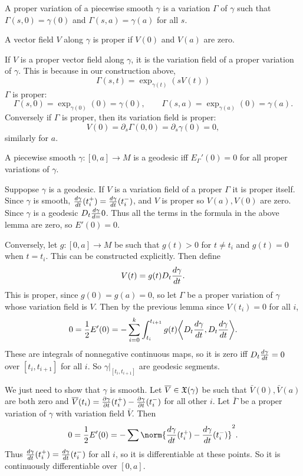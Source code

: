 \eproof

\bdefn

    A {\emphcolor proper variation} of a piecewise smooth $\gamma$ is a variation $\Gamma$ of $\gamma$ such that
    $\Gamma(s,0)=\gamma(0)$ and $\Gamma(s,a)=\gamma(a)$ for all $s$.

    A vector field $V$ along $\gamma$ is {\emphcolor proper} if $V(0)$ and $V(a)$ are zero.

\edefn

If $V$ is a proper vector field along $\gamma$, it is the variation field of a proper variation of $\gamma$.
This is because in our construction above,
$$ \Gamma(s,t) = \exp_{\gamma(t)}(sV(t)) $$
$\Gamma$ is proper:
$$ \Gamma(s,0) = \exp_{\gamma(0)}(0) = \gamma(0),\qquad \Gamma(s,a) = \exp_{\gamma(a)}(0) = \gamma(a) . $$
Conversely if $\Gamma$ is proper, then its variation field is proper:
$$ V(0) = \partial_s\Gamma(0,0) = \partial_s\gamma(0) = 0, $$
similarly for $a$.

\blemm

    A piecewise smooth $\gamma\colon[0,a]\to M$ is a geodesic iff $E_\Gamma'(0)=0$ for all proper variations of $\gamma$.

\elemm

\bproof

    Suppopse $\gamma$ is a geodesic.
    If $V$ is a variation field of a proper $\Gamma$ it is proper itself.
    Since $\gamma$ is smooth, ${{d\gamma}\over{dt}}(t_i^+)={{d\gamma}\over{dt}}(t_i^-)$, and $V$ is proper so $V(a),V(0)$ are zero.
    Since $\gamma$ is a geodesic $D_t{{d\gamma}\over{d=}}0$.
    Thus all the terms in the formula in the above lemma are zero, so $E'(0)=0$.

    Conversely, let $g\colon[0,a]\to M$ be such that $g(t)>0$ for $t\neq t_i$ and $g(t)=0$ when $t=t_i$.
    This can be constructed explicitly.
    Then define
    $$ V(t) = g(t)D_t{{d\gamma}\over{dt}}. $$
    This is proper, since $g(0)=g(a)=0$, so let $\Gamma$ be a proper variation of $\gamma$ whose variation field is $V$.
    Then by the previous lemma since $V(t_i)=0$ for all $i$,
    $$ 0 = {{1}\over{2}}E'(0) = -\sum_{i=0}^k\int_{t_i}^{t_{i+1}}g(t)\mathopen{}\mathclose{\left<D_t{{d\gamma}\over{dt}},D_t{{d\gamma}\over{dt}}\right>} . $$
    These are integrals of nonnegative continuous maps, so it is zero iff $D_t{{d\gamma}\over{dt}}=0$ over $[t_i,t_{i+1}]$
    for all $i$.
    So $\gamma|_{[t_i,t_{i+1}]}$ are geodesic segments.

    We just need to show that $\gamma$ is smooth.
    Let $\overline V\in{\frak X}(\gamma)$ be such that $\bar V(0),\bar V(a)$ are both zero and
    $\overline V(t_i)={{\partial \gamma}\over{\partial t}}(t_i^+)-{{\partial \gamma}\over{\partial t}}(t_i^-)$ for all other $i$.
    Let $\bar\Gamma$ be a proper variation of $\gamma$ with variation field $\bar V$.
    Then
    $$ 0 = \frac12E'(0) = -\sum\norm{\drvof\gamma t(t_i^+) - \drvof\gamma t(t_i^-)}^2 . $$
    Thus ${{d\gamma}\over{dt}}(t_i^+)={{d\gamma}\over{dt}}(t_i^-)$ for all $i$, so it is differentiable at these points.
    So it is continuously differentiable over $[0,a]$.

